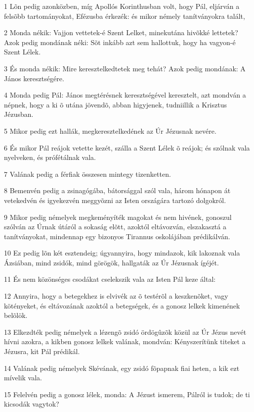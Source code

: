 \par 1 Lõn pedig azonközben, míg Apollós Korinthusban volt, hogy Pál, eljárván a felsõbb tartományokat, Efézusba érkezék: és mikor némely tanítványokra talált,
\par 2 Monda nékik: Vajjon vettetek-é Szent Lelket, minekutána hivõkké lettetek? Azok pedig mondának néki: Sõt inkább azt sem hallottuk, hogy ha vagyon-é Szent Lélek.
\par 3 És monda nékik: Mire keresztelkedtetek meg tehát? Azok pedig mondának: A János keresztségére.
\par 4 Monda pedig Pál: János megtérésnek keresztségével keresztelt, azt mondván a népnek, hogy a ki õ utána jövendõ, abban higyjenek, tudniillik a Krisztus Jézusban.
\par 5 Mikor pedig ezt hallák, megkeresztelkedének az Úr Jézusnak nevére.
\par 6 És mikor Pál reájok vetette kezét, szálla a Szent Lélek õ reájok; és szólnak vala nyelveken,  és prófétálnak vala.
\par 7 Valának pedig a férfiak összesen mintegy tizenketten.
\par 8 Bemenvén pedig a zsinagógába, bátorsággal szól vala, három hónapon át vetekedvén és igyekezvén meggyõzni az Isten országára tartozó dolgokról.
\par 9 Mikor pedig némelyek megkeményíték magokat és nem hivének, gonoszul szólván az Úrnak útáról a sokaság elõtt, azoktól eltávozván, elszakasztá a tanítványokat, mindennap egy bizonyos Tirannus oskolájában prédikálván.
\par 10 Ez pedig lõn két esztendeig; úgyannyira, hogy mindazok, kik lakoznak vala Ázsiában, mind zsidók, mind görögök, hallgaták az Úr Jézusnak ígéjét.
\par 11 És nem közönséges csodákat cselekszik vala az Isten Pál keze által:
\par 12 Annyira, hogy a betegekhez is elvivék az õ testérõl a keszkenõket, vagy kötényeket, és eltávozának azoktól a betegségek, és a gonosz lelkek kimenének belõlök.
\par 13 Elkezdték pedig némelyek a lézengõ zsidó ördögûzõk közül az Úr Jézus nevét hívni azokra, a kikben gonosz lelkek valának, mondván: Kényszerítünk titeket a Jézusra, kit Pál prédikál.
\par 14 Valának pedig némelyek Skévának, egy zsidó fõpapnak fiai heten, a kik ezt mívelik vala.
\par 15 Felelvén pedig a gonosz lélek, monda: A Jézust ismerem, Pálról is tudok;  de ti kicsodák vagytok?
